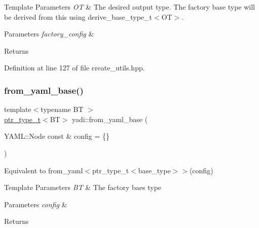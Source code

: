 \begin{DoxyTemplParams}{Template Parameters}
{\em OT} & The desired output type. The factory base type will be derived from this using derive\+\_\+base\+\_\+type\+\_\+t$<$\+O\+T$>$. \\
\hline
\end{DoxyTemplParams}

\begin{DoxyParams}{Parameters}
{\em factory\+\_\+config} & \\
\hline
\end{DoxyParams}
\begin{DoxyReturn}{Returns}

\end{DoxyReturn}


Definition at line 127 of file create\+\_\+utils.\+hpp.

\mbox{\label{namespaceyadi_a829744f635593fef1c05b0f9b01a8aa2}} 
\subsubsection{\texorpdfstring{from\+\_\+yaml\+\_\+base()}{from\_yaml\_base()}}
{\footnotesize\ttfamily template$<$typename BT $>$ \\
\hyperlink{namespaceyadi_a92290eb27cd90666aa87b17d854af9fe}{ptr\+\_\+type\+\_\+t}$<$BT$>$ yadi\+::from\+\_\+yaml\+\_\+base (\begin{DoxyParamCaption}\item[{Y\+A\+M\+L\+::\+Node const \&}]{config = {\ttfamily \{\}} }\end{DoxyParamCaption})}



Equivalent to from\+\_\+yaml$<$ptr\+\_\+type\+\_\+t$<$base\+\_\+type$>$$>$(config) 


\begin{DoxyTemplParams}{Template Parameters}
{\em BT} & The factory baes type \\
\hline
\end{DoxyTemplParams}

\begin{DoxyParams}{Parameters}
{\em config} & \\
\hline
\end{DoxyParams}
\begin{DoxyReturn}{Returns}

\end{DoxyReturn}


